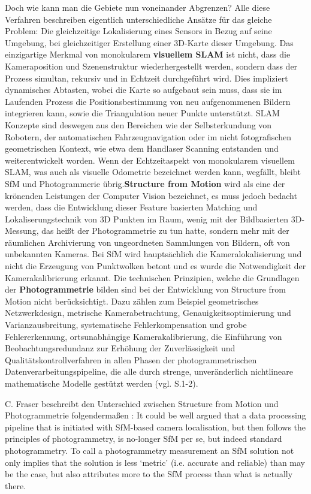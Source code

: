 Doch wie kann man die Gebiete nun voneinander Abgrenzen? Alle diese Verfahren beschreiben eigentlich unterschiedliche Ansätze für das gleiche Problem: Die gleichzeitige Lokalisierung eines Sensors in Bezug auf seine Umgebung, bei gleichzeitiger Erstellung einer 3D-Karte dieser Umgebung. Das einzigartige Merkmal von monokularem \textbf{visuellem SLAM} ist nicht, dass die Kameraposition und Szenenstruktur wiederhergestellt werden, sondern dass der Prozess simultan, rekursiv und in Echtzeit durchgeführt wird. Dies impliziert dynamisches Abtasten, wobei die Karte so aufgebaut sein muss, dass sie im Laufenden Prozess die Positionsbestimmung von neu aufgenommenen Bildern integrieren kann, sowie die Triangulation neuer Punkte unterstützt. SLAM Konzepte sind deswegen aus den Bereichen wie der Selbsterkundung von Robotern, der automatischen Fahrzeugnavigation oder im nicht fotografischen geometrischen Kontext, wie etwa dem Handlaser Scanning entstanden und weiterentwickelt worden. Wenn der Echtzeitaspekt von monokularem visuellem SLAM, was auch als visuelle Odometrie bezeichnet werden kann, wegfällt, bleibt SfM und Photogrammerie übrig.\textbf{Structure from Motion} wird als eine der krönenden Leistungen der Computer Vision bezeichnet, es muss jedoch bedacht werden, dass die Entwicklung dieser Feature basierten Matching und Lokaliserungstechnik von 3D Punkten im Raum, wenig mit der Bildbasierten 3D-Messung, das heißt der Photogrammetrie zu tun hatte, sondern mehr mit der räumlichen Archivierung von ungeordneten Sammlungen von Bildern, oft von unbekannten Kameras. Bei SfM wird hauptsächlich die Kameralokalisierung und nicht die Erzeugung von Punktwolken betont und es wurde die Notwendigkeit der Kamerakalibrierung erkannt. Die technischen Prinzipien, welche die Grundlagen der \textbf{Photogrammetrie} bilden sind bei der Entwicklung von Structure from Motion nicht berücksichtigt. Dazu zählen zum Beispiel geometrisches Netzwerkdesign, metrische Kamerabetrachtung, Genauigkeitsoptimierung und Varianzausbreitung, systematische Fehlerkompensation und grobe Fehlererkennung, ortsunabhängige Kamerakalibrierung, die Einführung von Beobachtungsredundanz zur Erhöhung der Zuverlässigkeit und Qualitätskontrollverfahren in allen Phasen der photogrammetrischen Datenverarbeitungspipeline, die alle durch strenge, unveränderlich nichtlineare mathematische Modelle gestützt werden (vgl. \cite{vergleich_fraser} S.1-2).

C. Fraser beschreibt den Unterschied zwischen Structure from Motion und Photogrammetrie folgendermaßen \cite{vergleich_fraser}: \glqq It could be well argued that a data processing pipeline that is initiated with SfM-based camera localisation, but then follows the principles of photogrammetry, is no-longer SfM per se, but indeed standard photogrammetry. To call a photogrammetry measurement an SfM solution not only implies that the solution is less ‘metric’ (i.e. accurate and reliable) than may be the case, but also attributes more to the SfM process than what is actually there.\grqq

